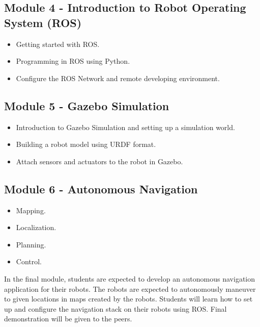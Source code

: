 \documentclass[11pt,letterpaper]{article}
\begin{document}
\subsection*{Module 4 - Introduction to Robot Operating System (ROS)}
\begin{itemize}
    \item Getting started with ROS.
    \item Programming in ROS using Python.
    \item Configure the ROS Network and remote developing environment.
\end{itemize}

\subsection*{Module 5 - Gazebo Simulation}
\begin{itemize}
    \item Introduction to Gazebo Simulation and setting up a simulation world.
    \item Building a robot model using URDF format.
    \item Attach sensors and actuators to the robot in Gazebo.
\end{itemize}

\subsection*{Module 6 - Autonomous Navigation}
\begin{itemize}
    \item Mapping.
    \item Localization.
    \item Planning.
    \item Control.
\end{itemize}
In the final module, students are expected to develop an autonomous navigation application for their robots. The robots are expected to autonomously maneuver to given locations in maps created by the robots. Students will learn how to set up and configure the navigation stack on their robots using ROS. Final demonstration will be given to the peers.     
\end{document}
